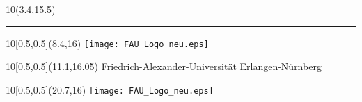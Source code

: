 \documentclass[12pt,a4paper]{article}
\begin{document}
\begin{titlepage}
\begin{center}

\end{center}
    
 
    
\begin{textblock}{10}(3.4,15.5)
      \color{FAU_Blue}
      \rule{185mm}{0.25mm}
    \end{textblock}  

    \begin{textblock}{10}[0.5,0.5](8.4,16)
      \texttt{[image: FAU\_Logo\_neu.eps]}
    \end{textblock}
    
    \begin{textblock}{10}[0.5,0.5](11.1,16.05)
      \color{FAU_Blue}
      {\large Friedrich-Alexander-Universität Erlangen-Nürnberg}
    \end{textblock}

    \begin{textblock}{10}[0.5,0.5](20.7,16)
      \texttt{[image: FAU\_Logo\_neu.eps]}
    \end{textblock}    
    
  \end{titlepage}
  
\newpage
\end{document}
